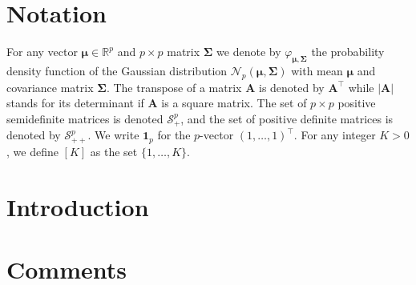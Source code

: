 \documentclass[a4paper,12pt]{article}
\title{\vspace{-60pt}~\\textbf{\textsf{Double sparsity in high-dimensional Gaussian mixture estimation and clustering}}\[20pt]
\textsf{Subject Overview}}
\author{\vspace{-20pt}~\ \textsf{Supervisor: A.S. Dalalyan}\
\textsf{PHd Student: M. Sebbar}}
\date{\today}
\let\bb\mathbb       %
\def\RR{{\bb R}}\def\ZZ{{\bb Z}}\def\FF{{\bb F}}\def\DD{{\bb D}}
\def\bb{\mathbb}
\def\bfA{\mathbf A}
\def\bSigma{\boldsymbol\Sigma}
\def\bmu{\boldsymbol\mu}
\def\b1{\mathbf 1}
\begin{document}
\maketitle
\tableofcontents
\newpage
\section{Notation}
For any vector $\bmu\in\RR^p$ and $p\times p$ matrix $\bSigma$ we denote by $\varphi_{\bmu,\bSigma}$ the probability density
function of the Gaussian distribution $\mathcal N_p(\bmu,\bSigma)$ with mean $\bmu$ and covariance matrix $\bSigma$.
The transpose of a matrix $\bfA $ is denoted by $\bfA ^\top$ while $|\bfA |$ stands for its determinant if $\bfA $ is a square matrix.
The set of $p\times p$ positive semidefinite matrices is denoted $\mathcal S_+^p$, and the set of positive definite
matrices is denoted by $\mathcal S_{++}^p$. We write $\b1_p$ for the $p$-vector $(1,\ldots,1)^\top$. For any integer $K>0$, we
define $[K]$ as the set $\{1,\ldots,K\}$.


\section{Introduction}



\newpage


\newpage

\newpage






\section{Comments}


\end{document}
